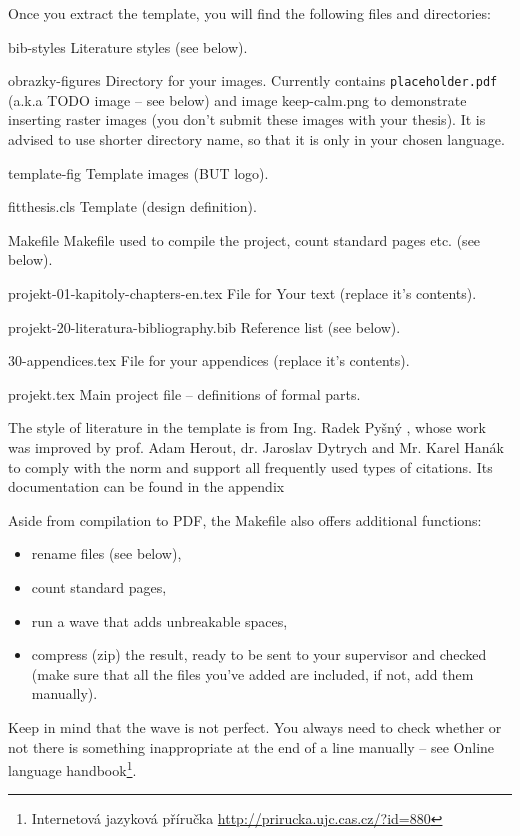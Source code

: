 Once you extract the template, you will find the following files and directories:
\begin{DESCRIPTION}
  \item [bib-styles] Literature styles (see below). 
  \item [obrazky-figures] Directory for your images. Currently contains \texttt{placeholder.pdf} (a.k.a TODO image -- see below) and image keep-calm.png to demonstrate inserting raster images (you don't submit these images with your thesis). It is advised to use shorter directory name, so that it is only in your chosen language.
  \item [template-fig] Template images (BUT logo).
  \item [fitthesis.cls] Template (design definition).
  \item [Makefile] Makefile used to compile the project, count standard pages etc. (see below).
  \item [projekt-01-kapitoly-chapters-en.tex] File for Your text (replace it's contents).
  \item [projekt-20-literatura-bibliography.bib] Reference list (see below).
  \item [30-appendices.tex] File for your appendices (replace it's contents).
  \item [projekt.tex] Main project file -- definitions of formal parts.
\end{DESCRIPTION}

The style of literature in the template is from Ing. Radek Pyšný \cite{Pysny}, whose work was improved by prof. Adam Herout, dr. Jaroslav Dytrych and Mr. Karel Hanák to comply with the norm and support all frequently used types of citations. Its documentation can be found in the appendix

Aside from compilation to PDF, the Makefile also offers additional functions:
\begin{itemize}
  \item rename files (see below),
  \item count standard pages,
  \item run a wave that adds unbreakable spaces,
  \item compress (zip) the result, ready to be sent to your supervisor and checked (make sure that all the files you've added are included, if not, add them manually).
\end{itemize}

Keep in mind that the wave is not perfect. You always need to check whether or not there is something inappropriate at the end of a line manually -- see Online language handbook\footnote{Internetová jazyková příručka \url{http://prirucka.ujc.cas.cz/?id=880}}.

